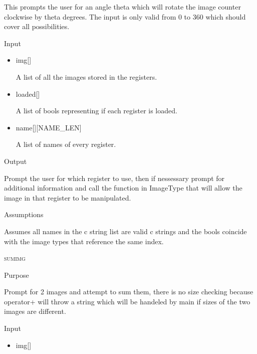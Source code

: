 \documentclass[pdftex, 11pt]{article}
\begin{document}
\begin{description}
\begin{description}
				This prompts the user for an angle theta which will rotate the image counter 
				clockwise by theta degrees.  The input is only valid from 0 to 360 which
				should cover all possibilities.

			\item{Input}

				\begin{itemize}

					\item{img[]}

						A list of all the images stored in the registers.

					\item{loaded[]}

						A list of bools representing if each register is loaded.

					\item{name[][NAME\_LEN]}

						A list of names of every register.

				\end{itemize}

			\item{Output}

				Prompt the user for which register to use, then if nessessary
				prompt for additional information and call the function
				in ImageType that will allow the image in that register to
				be manipulated.

			\item{Assumptions}

				Assumes all names in the c string list are valid c
				strings and the bools coincide with the image types that
				reference the same index.

		\end{description}



	\item{\textsc{sumimg}}
		\begin{description}
			\item{Purpose}

				Prompt for 2 images and attempt to sum them, there is no size checking because
				operator+ will throw a string which will be handeled by main if sizes of the
				two images are different.

			\item{Input}

				\begin{itemize}

					\item{img[]}


\end{itemize}
\end{description}
\end{description}
\end{document}
